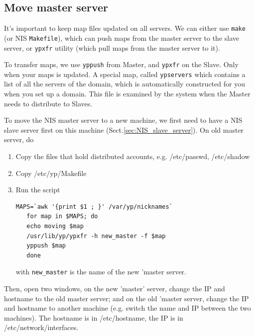 \subsection{Move master server}

It's important to keep map files updated on all servers. We can either use
\verb!make! (or NIS \verb!Makefile!), which can push maps from the master server
to the slave server, or \verb!ypxfr! utility (which pull maps from the master
server to it). 

To transfer maps, we use \verb!yppush! from Master, and \verb!ypxfr! on the
Slave. Only when your maps is updated. A special map, called \verb!ypservers!
which contains a list of all the servers of the domain, which is automatically
constructed for you when you set up a domain. This file is examined by the
system when the Master needs to distribute to Slaves. 


To move the NIS master server to a new machine, we first need to have a NIS
slave server first on this machine (Sect.\ref{sec:NIS_slave_server}). 
On old master server, do
\begin{enumerate}
  \item Copy the files that hold distributed accounts, e.g. /etc/passwd,
  /etc/shadow
  
  \item Copy /etc/yp/Makefile 

  \item Run the script

\begin{verbatim}
MAPS=`awk '{print $1 ; }' /var/yp/nicknames`
   for map in $MAPS; do
   echo moving $map
   /usr/lib/yp/ypxfr -h new_master -f $map
   yppush $map
   done
\end{verbatim}
with \verb!new_master! is the name of the new 'master server.
\end{enumerate}

Then, open two windows, on the new 'master' server, change the IP and hostname
to the old master server; and on the old 'master server, change the IP and
hostname to another machine (e.g. switch the name and IP between the two
machines). The hostname is in /etc/hostname, the IP is in
/etc/network/interfaces.

